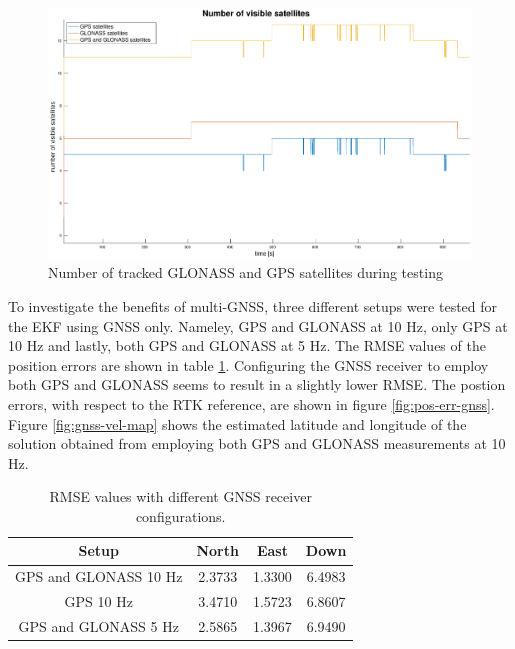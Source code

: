    \begin{figure}[!htbp]
        \hspace{-1.5cm}
        \includegraphics[scale=0.3]{Results/Images/n-visible.eps}
        \caption{Number of tracked GLONASS and GPS satellites during testing}
        \label{fig:n-sat}
    \end{figure}
    
    To investigate the benefits of multi-GNSS, three different setups were tested for the EKF using GNSS only. Nameley, GPS and GLONASS at 10 Hz, only GPS at 10 Hz and lastly, both GPS and GLONASS at 5 Hz. The RMSE values of the position errors are shown in table \ref{tab:rmse-gnss}. Configuring the GNSS receiver to employ both GPS and GLONASS seems to result in a slightly lower RMSE. The postion errors, with respect to the RTK reference, are shown in figure \ref{fig:pos-err-gnss}. Figure \ref{fig:gnss-vel-map} shows the estimated latitude and longitude of the solution obtained from employing both GPS and GLONASS measurements at 10 Hz.
    
    \begin{table}[!htbp]
        \centering
        \begin{tabular}{|c|c|c|c|}
            \hline
            \textbf{Setup} & \textbf{North} & \textbf{East} & \textbf{Down}\\
            \hline
            GPS and GLONASS 10 Hz &  2.3733  &  1.3300  &  6.4983\\
            GPS 10 Hz & 3.4710 &   1.5723 &   6.8607\\
            GPS and GLONASS 5 Hz & 2.5865  &  1.3967 & 6.9490\\
            \hline
        \end{tabular}
        \caption{RMSE values with different GNSS receiver configurations.}
        \label{tab:rmse-gnss}
    \end{table}
    
